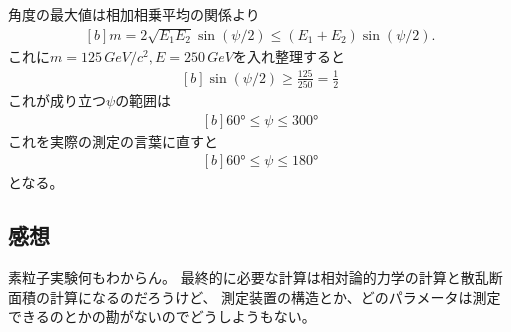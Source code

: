 \documentclass[../../sp_2013.tex]{subfiles}
\begin{document}
\subsection{}
角度の最大値は相加相乗平均の関係より
\begin{equation}\begin{aligned}[b]
    m = 2\sqrt{E_1E_2}\sin(\psi/2) \le (E_1+E_2)\sin(\psi/2).
\end{aligned}\end{equation}
これに\(m=125\,\si{GeV/c^2}, E=250\,{\si{GeV}}\)を入れ整理すると
\begin{equation}\begin{aligned}[b]
    \sin(\psi/2) \ge \frac{125}{250} = \frac{1}{2}
\end{aligned}\end{equation}
これが成り立つ\(\psi\)の範囲は
\begin{equation}\begin{aligned}[b]
    \ang{60}\le \psi \le \ang{300}
\end{aligned}\end{equation}
これを実際の測定の言葉に直すと
\begin{equation}\begin{aligned}[b]
    \ang{60}\le \psi \le \ang{180}
\end{aligned}\end{equation}
となる。

\subsection*{感想}
素粒子実験何もわからん。
最終的に必要な計算は相対論的力学の計算と散乱断面積の計算になるのだろうけど、
測定装置の構造とか、どのパラメータは測定できるのとかの勘がないのでどうしようもない。
\end{document}
